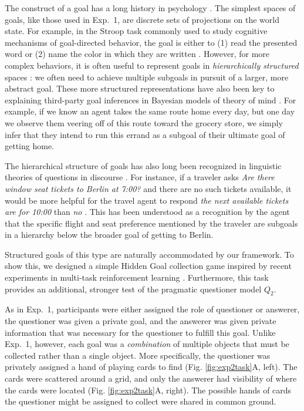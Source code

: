 \documentclass[11pt, floatsintext]{apa6}
\begin{document}
The construct of a goal has a long history in psychology \cite{miller1960plans, Schank:1977hh, austin1996goal}.
The simplest spaces of goals, like those used in Exp.~1, are discrete sets of projections on the world state.
For example, in the Stroop task commonly used to study cognitive mechanisms of goal-directed behavior, the goal is either to (1) read the presented word or (2) name the color in which they are written \cite{miller2001integrative}.
However, for more complex behaviors, it is often useful to represent goals in \emph{hierarchically structured} spaces \cite{badre2008cognitive,botvinick2008hierarchical}: we often need to achieve multiple subgoals in pursuit of a larger, more abstract goal. 
These more structured representations have also been key to explaining third-party goal inferences in Bayesian models of theory of mind \cite{BakerSaxeTenenbaum09_ActionUnderstandingInversePlanning}. 
For example, if we know an agent takes the same route home every day, but one day we observe them veering off of this route toward the grocery store, we simply infer that they intend to run this errand as a subgoal of their ultimate goal of getting home. 

The hierarchical structure of goals has also long been recognized in linguistic theories of questions in discourse  \cite{Kuppevelt95_TopicalityDiscourse,Roberts96_InformationStructureDiscourse,Buring03_DtreesBeansBaccents,Groenendijk99_LogicOfInterrogation,rojas2014discourse}.
For instance, if a traveler asks \emph{Are there window seat tickets to Berlin at 7:00?} and there are no such tickets available, it would be more helpful for the travel agent to respond \emph{the next available tickets are for 10:00} than \emph{no} \cite{rojas2013roadsigns}.
This has been understood as a recognition by the agent that the specific flight and seat preference mentioned by the traveler are subgoals in a hierarchy below the broader goal of getting to Berlin. 

Structured goals of this type are naturally accommodated by our framework. 
To show this, we designed a simple Hidden Goal collection game inspired by recent experiments in multi-task reinforcement learning \cite{oh2017zero, andreas2017modular}.
Furthermore, this task provides an additional, stronger test of the pragmatic questioner model $Q_2$.


As in Exp.~1, participants were either assigned the role of questioner or answerer, the questioner was given a private goal, and the answerer was given private information that was necessary for the questioner to fulfill this goal.
Unlike Exp.~1, however, each goal was a \emph{combination} of multiple objects that must be collected rather than a single object.
More specifically, the questioner was privately assigned a hand of playing cards to find (Fig. \ref{fig:exp2task}A, left). 
The cards were scattered around a grid, and only the answerer had visibility of where the cards were located (Fig. \ref{fig:exp2task}A, right).
The possible hands of cards the questioner might be assigned to collect were shared in common ground.
\end{document}
